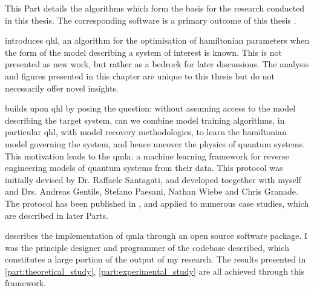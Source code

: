 
This Part details the algorithms which form the basis for the research conducted in this thesis. 
The corresponding software is a primary outcome of this thesis \cite{flynn2021Quantum, flynn2021QMLA, qmla_docs}.

\par 
\vspace{1cm}

 introduces \gls{qhl}, an algorithm for the optimisation of \gls{hamiltonian} parameters
    when the form of the model describing a system of interest is known. 
    This is not presented as new work, but rather as a bedrock for later discussions. 
    The analysis and figures presented in this chapter are unique to this thesis but do not necessarily offer novel insights. 
\par 
\vspace{1cm}
 builds upon \gls{qhl} by posing the question: 
    without assuming access to the model describing the target system, can we combine model training algorithms, 
    in particular \gls{qhl}, with model recovery methodologies, to learn the \gls{hamiltonian} model 
    governing the system, and hence uncover the physics of quantum systems. 
    This motivation leads to the \acrfull{qmla}: 
    a machine learning framework for reverse engineering models of quantum systems from their data.
    This protocol was initially devised by Dr. Raffaele Santagati, 
    and developed toegether with myself and Drs. Andreas Gentile, Stefano Paesani, Nathan Wiebe and Chris Granade. 
    The protocol has been published in \cite{gentile2020learning}, 
    and applied to numerous case studies, which are described in later Parts. 
\par
\vspace{1cm}

 describes the implementation of \gls{qmla} through an open source software package. 
I was the principle designer and programmer of the codebase described, which constitutes a large portion of the output of my research. 
The results presented in \cref{part:theoretical_study}, \cref{part:experimental_study} are all achieved through this framework. 

